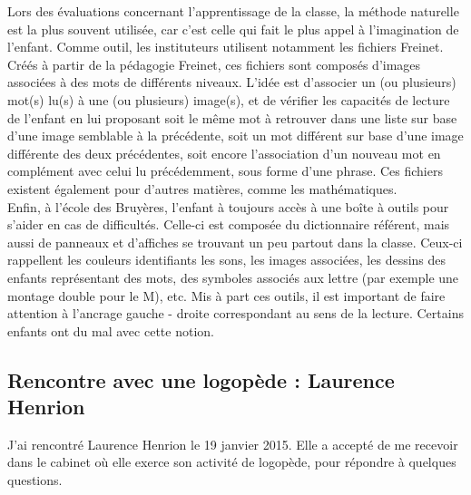 Lors des évaluations concernant l'apprentissage de la classe, la méthode naturelle est la plus souvent utilisée, car c'est celle qui fait le plus appel à l'imagination de l'enfant. Comme outil, les instituteurs utilisent notamment les fichiers Freinet. Créés à partir de la pédagogie Freinet, ces fichiers sont composés d'images associées à des mots de différents niveaux. L'idée est d'associer un (ou plusieurs) mot(s) lu(s) à une (ou plusieurs) image(s), et de vérifier les capacités de lecture de l'enfant en lui proposant soit le même mot à retrouver dans une liste sur base d'une image semblable à la précédente, soit un mot différent sur base d'une image différente des deux précédentes, soit encore l'association d'un nouveau mot en complément avec celui lu précédemment, sous forme d'une phrase. Ces fichiers existent également pour d'autres matières, comme les mathématiques.\\

Enfin, à l'école des Bruyères, l'enfant à toujours accès à une boîte à outils pour s'aider en cas de difficultés. Celle-ci est composée du dictionnaire référent, mais aussi de panneaux et d'affiches se trouvant un peu partout dans la classe. Ceux-ci rappellent les couleurs identifiants les sons, les images associées, les dessins des enfants représentant des mots, des symboles associés aux lettre (par exemple une montage double pour le M), etc. Mis à part ces outils, il est important de faire attention à l'ancrage gauche - droite correspondant au sens de la lecture. Certains enfants ont du mal avec cette notion.

\subsection*{Rencontre avec une logopède : Laurence Henrion}
J'ai rencontré Laurence Henrion le 19 janvier 2015. Elle a accepté de me recevoir dans le cabinet où elle exerce son activité de logopède, pour répondre à quelques questions.\\

